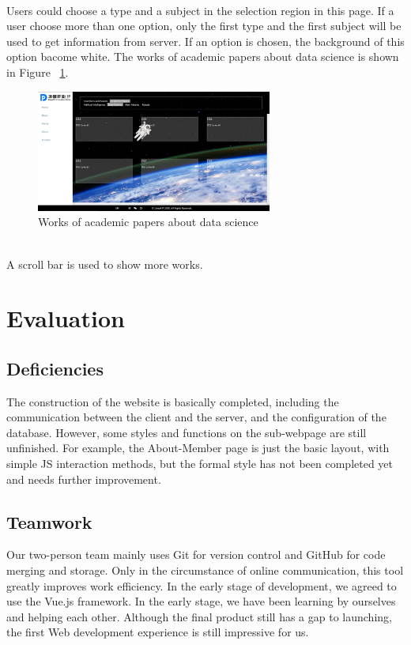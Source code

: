 \documentclass{article}
\begin{document}
~\\
\noindent
Users could choose a type and a subject in the selection region in this page.
If a user choose more than one option, only the first type and the first subject
will be used to get information from server. If an option is chosen, the background
of this option bacome white. The works of academic papers about data science is shown
in Figure ~\ref{fig: figure6}.

\begin{figure}[h]
    \centering
    \includegraphics[height=4cm]{img/sectionPNG/Works2.png}
    \caption{Works of academic papers about data science}
    \label{fig: figure6}
\end{figure}

~\\
\noindent
A scroll bar is used to show more works.

\section{Evaluation}
\subsection{Deficiencies}
The construction of the website is basically completed, including 
the communication between the client and the server, and the 
configuration of the database. However, some styles and functions 
on the sub-webpage are still unfinished. For example, the About-Member
page is just the basic layout, with simple JS interaction methods, 
but the formal style has not been completed yet and needs further improvement.
\subsection{Teamwork}
Our two-person team mainly uses Git for version control and 
GitHub for code merging and storage. Only in the circumstance 
of online communication, this tool greatly improves work 
efficiency. In the early stage of development, we agreed 
to use the Vue.js framework. In the early stage, we have 
been learning by ourselves and helping each other. 
Although the final product still has a gap to launching, 
the first Web development experience is still impressive for us.
    
\end{document}
